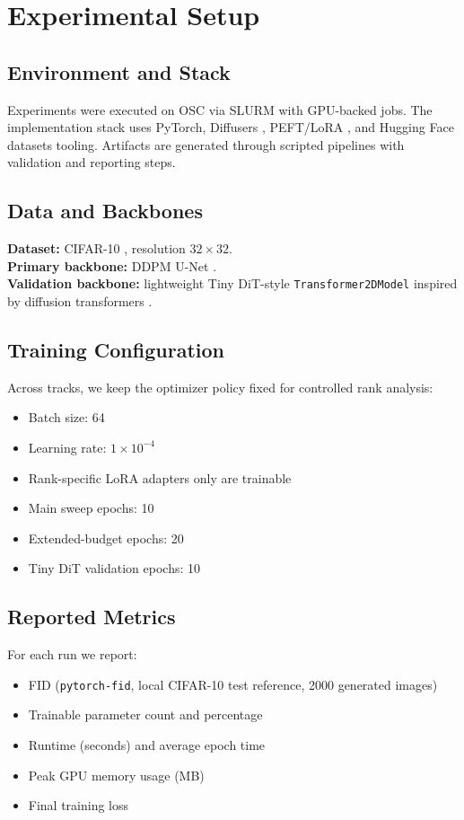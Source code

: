 \section{Experimental Setup}

\subsection{Environment and Stack}
Experiments were executed on OSC via SLURM with GPU-backed jobs. The implementation stack uses PyTorch, Diffusers \cite{vonplaten2022diffusers}, PEFT/LoRA \cite{hu2022lora}, and Hugging Face datasets tooling. Artifacts are generated through scripted pipelines with validation and reporting steps.

\subsection{Data and Backbones}
\textbf{Dataset:} CIFAR-10 \cite{krizhevsky2009cifar}, resolution \(32\times32\).\\
\textbf{Primary backbone:} DDPM U-Net \cite{ho2020ddpm}.\\
\textbf{Validation backbone:} lightweight Tiny DiT-style \texttt{Transformer2DModel} inspired by diffusion transformers \cite{peebles2023dit}.

\subsection{Training Configuration}
Across tracks, we keep the optimizer policy fixed for controlled rank analysis:
\begin{itemize}[leftmargin=1.5em]
  \item Batch size: 64
  \item Learning rate: \(1\times10^{-4}\)
  \item Rank-specific LoRA adapters only are trainable
  \item Main sweep epochs: 10
  \item Extended-budget epochs: 20
  \item Tiny DiT validation epochs: 10
\end{itemize}

\subsection{Reported Metrics}
For each run we report:
\begin{itemize}[leftmargin=1.5em]
  \item FID (\texttt{pytorch-fid}, local CIFAR-10 test reference, 2000 generated images)
  \item Trainable parameter count and percentage
  \item Runtime (seconds) and average epoch time
  \item Peak GPU memory usage (MB)
  \item Final training loss
\end{itemize}
